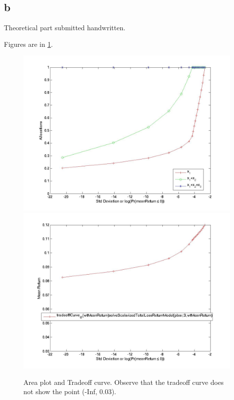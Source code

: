 \documentclass{article}
\begin{document}
\subsection{b}
Theoretical part submitted handwritten.

Figures are in \ref{fig:results1b}.

\begin{figure}[h!]
\includegraphics[scale=0.15]{log/portfolio/allocationCurves_@(wtMeanReturn)solveScalarizedTotalLossReturnModel(pbar,S,wtMeanReturn)2010-05-09-16:02:39:987.jpg}
\includegraphics[scale=0.15]{log/portfolio/tradeoffCurve_@(wtMeanReturn)solveScalarizedTotalLossReturnModel(pbar,S,wtMeanReturn)2010-05-09-16:02:38:198.jpg}
\label{fig:results1b}
\caption{Area plot and Tradeoff curve. Observe that the tradeoff curve does not show the point (-Inf, 0.03).}
\end{figure}
\end{document}
